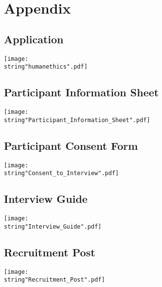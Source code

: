 \chapter{Appendix}\label{C:appendix}

\section{Application}
\texttt{[image: \\string"humanethics".pdf]}


\section{Participant Information Sheet}
\texttt{[image: \\string"Participant\_Information\_Sheet".pdf]}


\section{Participant Consent Form}
\texttt{[image: \\string"Consent\_to\_Interview".pdf]}


\section{Interview Guide}
\texttt{[image: \\string"Interview\_Guide".pdf]}


\section{Recruitment Post}
\texttt{[image: \\string"Recruitment\_Post".pdf]}



